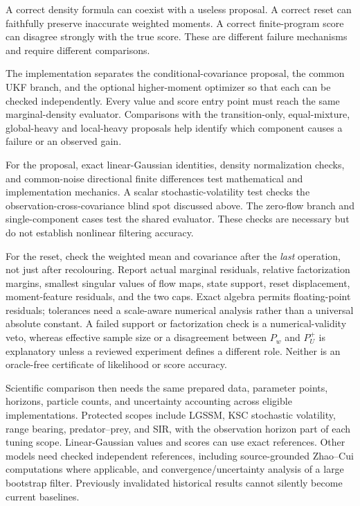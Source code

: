 A correct density formula can coexist with a useless proposal. A correct
reset can faithfully preserve inaccurate weighted moments. A correct
finite-program score can disagree strongly with the true score. These
are different failure mechanisms and require different comparisons.

The implementation separates the conditional-covariance proposal, the
common UKF branch, and the optional higher-moment optimizer so that each
can be checked independently. Every value and score entry point must reach
the same marginal-density evaluator. Comparisons with the transition-only,
equal-mixture, global-heavy and local-heavy proposals help identify which
component causes a failure or an observed gain.

For the proposal, exact linear-Gaussian identities, density normalization
checks, and common-noise directional finite differences test mathematical
and implementation mechanics. A scalar stochastic-volatility test checks
the observation-cross-covariance blind spot discussed above. The zero-flow
branch and single-component cases test the shared evaluator. These checks
are necessary but do not establish nonlinear filtering accuracy.

For the reset, check the weighted mean and covariance after the \emph{last}
operation, not just after recolouring. Report actual marginal residuals,
relative factorization margins, smallest singular values of flow maps,
state support, reset displacement, moment-feature residuals, and the two
caps. Exact algebra permits floating-point residuals; tolerances need a
scale-aware numerical analysis rather than a universal absolute constant.
A failed support or factorization check is a numerical-validity veto,
whereas effective sample size or a disagreement between \(P_w\) and
\(P_U^+\) is explanatory unless a reviewed experiment defines a different
role. Neither is an oracle-free certificate of likelihood or score accuracy.

Scientific comparison then needs the same prepared data, parameter points,
horizons, particle counts, and uncertainty accounting across eligible
implementations. Protected scopes include LGSSM, KSC stochastic volatility,
range bearing, predator--prey, and SIR, with the observation horizon part of
each tuning scope. Linear-Gaussian values and scores can use exact references.
Other models need checked independent references, including source-grounded
Zhao--Cui computations where applicable, and convergence/uncertainty analysis
of a large bootstrap filter. Previously invalidated historical results
cannot silently become current baselines.

